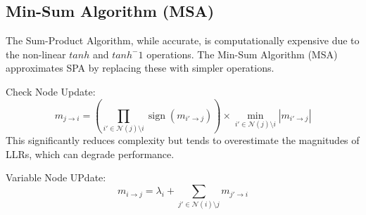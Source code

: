 \subsection{Min-Sum Algorithm (MSA)}
The Sum-Product Algorithm, while accurate, is computationally expensive due to the non-linear $tanh$ and $tanh^-1$ operations. 
The Min-Sum Algorithm (MSA) approximates SPA by replacing these with simpler operations.

Check Node Update:
$$
m_{j \to i} = \left( \prod_{i' \in \mathcal{N}(j) \setminus i} \operatorname{sign}(m_{i' \to j}) \right)
\times \min_{i' \in \mathcal{N}(j) \setminus i} \left| m_{i' \to j} \right|
$$
This significantly reduces complexity but tends to overestimate the magnitudes of LLRs, which can degrade performance.

Variable Node UPdate:
$$
m_{i \to j} = \lambda_i + \sum_{j' \in \mathcal{N}(i) \setminus j} m_{j' \to i}
$$